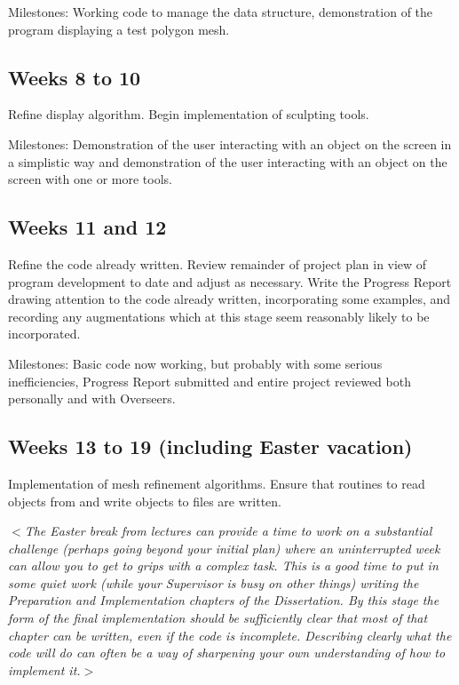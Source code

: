 \documentclass[12pt]{article}
\newcommand{\al}{$<$}
\newcommand{\ar}{$>$}
\begin{document}
Milestones: Working code to manage the data structure, demonstration
of the program displaying a test polygon mesh.


\subsection*{Weeks 8 to 10}

Refine display algorithm.  Begin implementation of sculpting tools.

Milestones: Demonstration of the user interacting with an object on
the screen in a simplistic way and demonstration of the user
interacting with an object on the screen with one or more tools.


\subsection*{Weeks 11 and 12}

Refine the code already written.  Review remainder of project plan in
view of program development to date and adjust as necessary.  Write
the Progress Report drawing attention to the code already written,
incorporating some examples, and recording any augmentations which at
this stage seem reasonably likely to be incorporated.

Milestones: Basic code now working, but probably with some serious
inefficiencies, Progress Report submitted and entire project reviewed
both personally and with Overseers.


\subsection*{Weeks 13 to 19 (including Easter vacation)}

Implementation of mesh refinement algorithms.  Ensure that routines to
read objects from and write objects to files are written.

\al\emph{The Easter break from lectures can provide a time to work on
  a substantial challenge (perhaps going beyond your initial plan)
  where an uninterrupted week can allow you to get to grips with a
  complex task.  This is a good time to put in some quiet work (while
  your Supervisor is busy on other things) writing the Preparation and
  Implementation chapters of the Dissertation.  By this stage the form
  of the final implementation should be sufficiently clear that most
  of that chapter can be written, even if the code is incomplete.
  Describing clearly what the code will do can often be a way of
  sharpening your own understanding of how to implement it.}\ar
\end{document}
